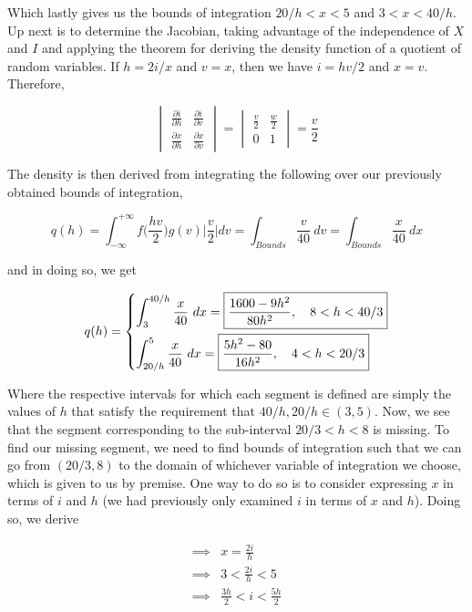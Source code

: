 \documentclass[10pt, oneside]{article}
\begin{document}
\begin{enumerate}[label=6.\arabic*]
Which lastly gives us the bounds of integration $20/h < x < 5$ and $3 < x < 40/h$. Up next is to determine the Jacobian, taking advantage of the independence of $X$ and $I$ and applying the theorem for deriving the density function of a quotient of random variables. If $h = 2i/x$ and $v = x$, then we have $i = hv/2$ and $x = v$. Therefore,

\begingroup
\renewcommand*{\arraystretch}{3.5}
\[ \begin{vmatrix}
\frac{\partial i}{\partial h} & \frac{\partial i}{\partial v} \\
\frac{\partial x}{\partial h} & \frac{\partial x}{\partial v}
\end{vmatrix} = \begin{vmatrix}
\frac{v}{2} & \frac{w}{2} \\
0 & 1
\end{vmatrix}
 = \frac{v}{2} \]
 \endgroup

The density is then derived from integrating the following over our previously obtained bounds of integration,

\[ q(h) = \int^{+\infty}_{-\infty} f \Big( \frac{hv}{2} \Big) g(v) \Big| \frac{v}{2} \Big| dv = \int_{Bounds} \frac{v}{40} \ dv = \int_{Bounds} \frac{x}{40} \ dx \]

and in doing so, we get

\[ q(h) =
\begin{dcases}
\int^{40/h}_3 \frac{x}{40} \ dx = \boxed{ \frac{1600-9h^2}{80h^2}, \quad 8 < h < 40/3 } \\
\int^5_{20/h} \frac{x}{40} \ dx = \boxed{ \frac{5h^2 - 80}{16 h^2}, \quad 4 < h < 20/3 }
\end{dcases}
\]

Where the respective intervals for which each segment is defined are simply the values of $h$ that satisfy the requirement that $40/h, 20/h \in (3,5)$. Now, we see that the segment corresponding to the sub-interval $20/3 < h < 8$ is missing. To find our missing segment, we need to find bounds of integration such that we can go from $(20/3, 8)$ to the domain of whichever variable of integration we choose, which is given to us by premise. One way to do so is to consider expressing $x$ in terms of $i$ and $h$ (we had previously only examined $i$ in terms of $x$ and $h$). Doing so, we derive

\begin{align*}
\implies& x = \frac{2i}{h} \\
\implies& 3 < \frac{2i}{h} < 5 \\
\implies& \frac{3h}{2} < i < \frac{5h}{2}
\end{align*}


\end{enumerate}
\end{document}
